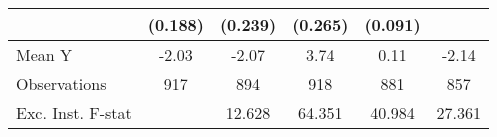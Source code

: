 {\begin{tabular}{l*{5}{c}}
            &     (0.188)         &     (0.239)         &     (0.265)         &     (0.091)         &                     \\
\midrule
Mean Y      &       -2.03         &       -2.07         &        3.74         &        0.11         &       -2.14         \\
Observations&         917         &         894         &         918         &         881         &         857         \\
Exc. Inst. F-stat&                     &      12.628         &      64.351         &      40.984         &      27.361         \\
\bottomrule
\end{tabular}
}
